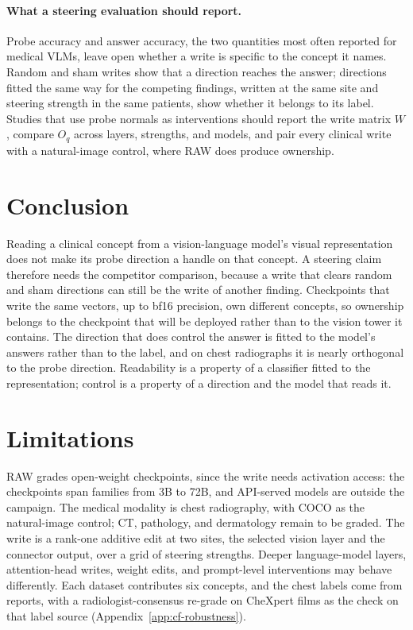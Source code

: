 \documentclass[11pt]{article}
\begin{document}
\paragraph{What a steering evaluation should report.}
Probe accuracy and answer accuracy, the two quantities most often reported for medical VLMs, leave open whether a write is specific to the concept it names. Random and sham writes show that a direction reaches the answer; directions fitted the same way for the competing findings, written at the same site and steering strength in the same patients, show whether it belongs to its label. Studies that use probe normals as interventions should report the write matrix $W$, compare $O_q$ across layers, strengths, and models, and pair every clinical write with a natural-image control, where RAW does produce ownership.

\section{Conclusion}
\label{sec:conclusion}

Reading a clinical concept from a vision-language model's visual representation does not make its probe direction a handle on that concept. A steering claim therefore needs the competitor comparison, because a write that clears random and sham directions can still be the write of another finding. Checkpoints that write the same vectors, up to bf16 precision, own different concepts, so ownership belongs to the checkpoint that will be deployed rather than to the vision tower it contains. The direction that does control the answer is fitted to the model's answers rather than to the label, and on chest radiographs it is nearly orthogonal to the probe direction. Readability is a property of a classifier fitted to the representation; control is a property of a direction and the model that reads it.


\section*{Limitations}
\label{sec:limitations}
RAW grades open-weight checkpoints, since the write needs activation access: the \cfCheckpoints{} checkpoints span \cfFamiliesWord{} families from 3B to 72B, and API-served models are outside the campaign. The medical modality is chest radiography, with COCO as the natural-image control; CT, pathology, and dermatology remain to be graded. The write is a rank-one additive edit at two sites, the selected vision layer and the connector output, over a grid of steering strengths. Deeper language-model layers, attention-head writes, weight edits, and prompt-level interventions may behave differently. Each dataset contributes six concepts, and the chest labels come from reports, with a radiologist-consensus re-grade on \cfValidRows{} CheXpert films as the check on that label source (Appendix~\ref{app:cf-robustness}).
\end{document}

